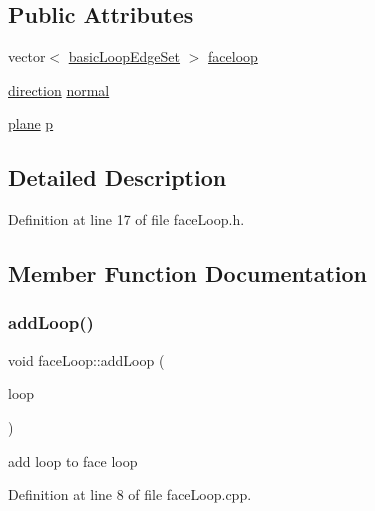\subsection*{Public Attributes}
\begin{DoxyCompactItemize}
\item 
vector$<$ \mbox{\hyperlink{classbasic_loop_edge_set}{basic\+Loop\+Edge\+Set}} $>$ \mbox{\hyperlink{classface_loop_a3f032bc5496c429abc4723632d29ceaf}{faceloop}}
\item 
\mbox{\hyperlink{structdirection}{direction}} \mbox{\hyperlink{classface_loop_a2ac7efac9235e5d6c6c4694f2ea8a6c2}{normal}}
\item 
\mbox{\hyperlink{structplane}{plane}} \mbox{\hyperlink{classface_loop_ace3e113db57081ef98d333a5bfd32daa}{p}}
\end{DoxyCompactItemize}


\subsection{Detailed Description}


Definition at line 17 of file face\+Loop.\+h.



\subsection{Member Function Documentation}
\mbox{\label{classface_loop_ae948abd198e6e1496bd320d18b5d638b}} 
\subsubsection{\texorpdfstring{add\+Loop()}{addLoop()}}
{\footnotesize\ttfamily void face\+Loop\+::add\+Loop (\begin{DoxyParamCaption}\item[{\mbox{\hyperlink{classbasic_loop_edge_set}{basic\+Loop\+Edge\+Set}}}]{loop }\end{DoxyParamCaption})}

add loop to face loop 

Definition at line 8 of file face\+Loop.\+cpp.

\mbox{\label{classface_loop_aa57ee2f9fd011ac4a8aa9b922998c34a}} 
